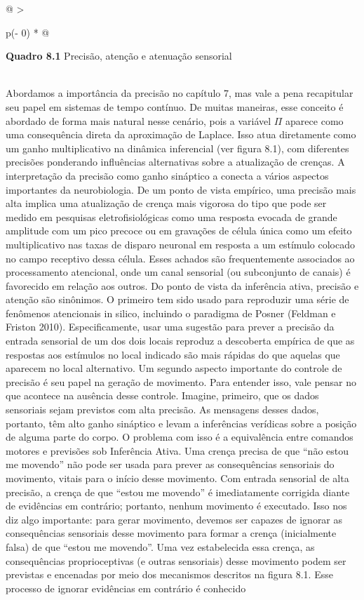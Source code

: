 \documentclass[
  12pt,
]{book}
\begin{document}
\begin{longtable}[]{@{}
  >{\raggedright\arraybackslash}p{(\columnwidth - 0\tabcolsep) * }@{}}
\toprule
\begin{minipage}[b]{\linewidth}\raggedright
\textbf{Quadro 8.1} Precisão, atenção e atenuação sensorial
\end{minipage} \\
\midrule
\endhead
Abordamos a importância da precisão no capítulo 7, mas vale a pena recapitular seu papel em sistemas de tempo contínuo. De muitas maneiras, esse conceito é abordado de forma mais natural nesse cenário, pois a variável \(\Pi\) aparece como uma consequência direta da aproximação de Laplace. Isso atua diretamente como um ganho multiplicativo na dinâmica inferencial (ver figura 8.1), com diferentes precisões ponderando influências alternativas sobre a atualização de crenças.\( \) A interpretação da precisão como ganho sináptico a conecta a vários aspectos importantes da neurobiologia. De um ponto de vista empírico, uma precisão mais alta implica uma atualização de crença mais vigorosa do tipo que pode ser medido em pesquisas eletrofisiológicas como uma resposta evocada de grande amplitude com um pico precoce ou em gravações de célula única como um efeito multiplicativo nas taxas de disparo neuronal em resposta a um estímulo colocado no campo receptivo dessa célula. Esses achados são frequentemente associados ao processamento atencional, onde um canal sensorial (ou subconjunto de canais) é favorecido em relação aos outros. Do ponto de vista da inferência ativa, precisão e atenção são sinônimos. O primeiro tem sido usado para reproduzir uma série de fenômenos atencionais in silico, incluindo o paradigma de Posner (Feldman e Friston 2010). Especificamente, usar uma sugestão para prever a precisão da entrada sensorial de um dos dois locais reproduz a descoberta empírica de que as respostas aos estímulos no local indicado são mais rápidas do que aquelas que aparecem no local alternativo.\( \) Um segundo aspecto importante do controle de precisão é seu papel na geração de movimento. Para entender isso, vale pensar no que acontece na ausência desse controle. Imagine, primeiro, que os dados sensoriais sejam previstos com alta precisão. As mensagens desses dados, portanto, têm alto ganho sináptico e levam a inferências verídicas sobre a posição de alguma parte do corpo. O problema com isso é a equivalência entre comandos motores e previsões sob Inferência Ativa. Uma crença precisa de que ``não estou me movendo'' não pode ser usada para prever as consequências sensoriais do movimento, vitais para o início desse movimento. Com entrada sensorial de alta precisão, a crença de que ``estou me movendo'' é imediatamente corrigida diante de evidências em contrário; portanto, nenhum movimento é executado. Isso nos diz algo importante: para gerar movimento, devemos ser capazes de ignorar as consequências sensoriais desse movimento para formar a crença (inicialmente falsa) de que ``estou me movendo''. Uma vez estabelecida essa crença, as consequências proprioceptivas (e outras sensoriais) desse movimento podem ser previstas e encenadas por meio dos mecanismos descritos na figura 8.1. Esse processo de ignorar evidências em contrário é conhecido 
\end{longtable}
\end{document}
